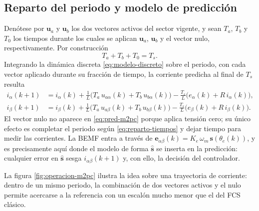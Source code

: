 \documentclass[../../../Tesis_JALS_Maestria.tex]{subfiles}
\begin{document}
\subsection{Reparto del periodo y modelo de predicción}
\label{sec:m2pc-prediccion}

Denótese por $\mathbf{u}_a$ y $\mathbf{u}_b$ los dos vectores activos del sector vigente, y sean $T_a$, $T_b$ y $T_0$ los tiempos durante los cuales se aplican $\mathbf{u}_a$, $\mathbf{u}_b$ y el vector nulo, respectivamente. Por construcción
\begin{equation}
    T_a + T_b + T_0 = T_s.
    \label{eq:reparto-tiempos}
\end{equation}
Integrando la dinámica discreta \eqref{eq:modelo-discreto} sobre el periodo, con cada vector aplicado durante su fracción de tiempo, la corriente predicha al final de $T_s$ resulta
\begin{subequations}
\label{eq:pred-m2pc}
\begin{align}
    i_\alpha(k+1) &= i_\alpha(k) + \frac{1}{L}\bigl(T_a\,u_{a\alpha}(k) + T_b\,u_{b\alpha}(k)\bigr) - \frac{T_s}{L}\bigl(e_\alpha(k) + R\,i_\alpha(k)\bigr),\\
    i_\beta(k+1)  &= i_\beta(k)  + \frac{1}{L}\bigl(T_a\,u_{a\beta}(k)  + T_b\,u_{b\beta}(k)\bigr)  - \frac{T_s}{L}\bigl(e_\beta(k)  + R\,i_\beta(k)\bigr).
\end{align}
\end{subequations}
El vector nulo no aparece en \eqref{eq:pred-m2pc} porque aplica tensión cero; su único efecto es completar el periodo según \eqref{eq:reparto-tiempos} y dejar tiempo para medir las corrientes. La BEMF entra a través de $\mathbf{e}_{\alpha\beta}(k) = K_e\,\omega_m\,\mathbf{s}(\theta_e(k))$, y es precisamente aquí donde el modelo de forma $\hat{\mathbf{s}}$ se inserta en la predicción: cualquier error en $\hat{\mathbf{s}}$ sesga $i_{\alpha\beta}(k+1)$ y, con ello, la decisión del controlador.

La figura \ref{fig:operacion-m2pc} ilustra la idea sobre una trayectoria de corriente: dentro de un mismo periodo, la combinación de dos vectores activos y el nulo permite acercarse a la referencia con un escalón mucho menor que el del FCS clásico.
\end{document}
